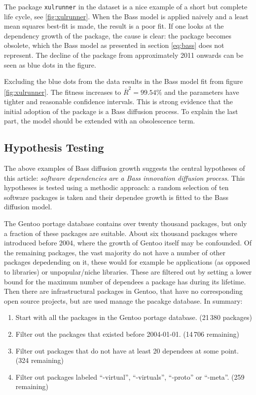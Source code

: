 \documentclass[smallextended,final]{svjour3}
\begin{document}
The package \verb|xulrunner| in the dataset is a nice example of a short but complete life cycle, see \ref{fig:xulrunner}. When the Bass model is applied naively and a least mean squares best-fit is made, the result is a poor fit. If one looks at the dependency growth of the package, the cause is clear: the package becomes obsolete, which the Bass model as presented in section \ref{eq:bass} does not represent. The decline of the package from approximately 2011 onwards can be seen as blue dots in the figure.

Excluding the blue dots from the data results in the Bass model fit from figure \ref{fig:xulrunner}. The fitness increases to $\overline{R}^2 =99.54\%$ and the parameters have tighter and reasonable confidence intervals. This is strong evidence that the initial adoption of the package is a Bass diffusion process. To explain the last part, the model should be extended with an obsolescence term. 

\subsection{Hypothesis Testing}

The above examples of Bass diffusion growth suggests the central hypotheses of this article: \emph{software dependencies are a Bass innovation diffusion process.} This hypotheses is tested using a methodic approach: a random selection of ten software packages is taken and their dependee growth is fitted to the Bass diffusion model.

The Gentoo portage database contains over twenty thousand packages, but only a fraction of these packages are suitable. About six thousand packages where introduced before 2004, where the growth of Gentoo itself may be confounded. Of the remaining packages, the vast majority do not have a number of other packages depedending on it, these would for example be applications (as opposed to libraries) or unpopular/niche libraries. These are filtered out by setting a lower bound for the maximum number of dependees a package has during its lifetime. Then there are infrastructural packages in Gentoo, that have no corresponding open source projects, but are used manage the pacakge database. In summary:

\begin{enumerate}
	\item Start with all the packages in the Gentoo portage database. (21\,380 packages)
	\item Filter out the packages that existed before 2004-01-01. (14\,706 remaining)
	\item Filter out packages that do not have at least 20 dependees at some point. (324 remaining)
	\item Filter out packages labeled ``-virtual'', ``-virtuals'', ``-proto'' or ``-meta''. (259 remaining)
\end{enumerate}
\end{document}
